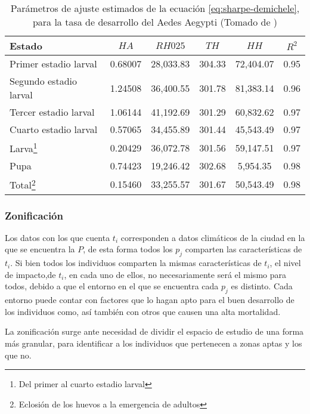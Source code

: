 \begin{table}
\begin{minipage}{\paperwidth}
\begin{tabular}{p{6cm} c c c c c }
Estado                     & $HA$    & $RH025$   & $TH$   & $HH$      & $R^2$   \\
\hline
Primer estadio larval      & 0.68007 & 28,033.83 & 304.33 & 72,404.07 & 0.95 \\
Segundo estadio larval     & 1.24508 & 36,400.55 & 301.78 & 81,383.14 & 0.96 \\
Tercer estadio larval      & 1.06144 & 41,192.69 & 301.29 & 60,832.62 & 0.97 \\
Cuarto estadio larval      & 0.57065 & 34,455.89 & 301.44 & 45,543.49 & 0.97 \\
Larva\footnote{Del primer al cuarto estadio larval} & 0.20429 & 36,072.78 & 301.56 & 59,147.51 & 0.97 \\
Pupa                       & 0.74423 & 19,246.42 & 302.68 & 5,954.35 & 0.98  \\
Total\footnote{Eclosión de los huevos a la emergencia de adultos}& 0.15460 & 33,255.57 & 301.67 & 50,543.49 & 0.98 \\

\end{tabular}
\end{minipage}
\caption{ \label{tab:tasa-desarrollo} Parámetros de ajuste estimados de la ecuación \eqref{eq:sharpe-demichele}, 
para la tasa de desarrollo del Aedes Aegypti (Tomado de \cite{rueda1990temperature})}
 
\end{table}

\subsubsection{Zonificación}
Los datos con los que cuenta $t_{i}$ corresponden a datos climáticos de la ciudad en la que se encuentra la
$P$, de esta forma todos los $p_{j}$ comparten las características de $t_{i}$. Si bien todos los individuos
comparten la mismas características de $t_{i}$, el nivel de impacto,de $t_{i}$, en cada uno de ellos, no
necesariamente será el mismo para todos, debido a que el entorno en el que se encuentra cada $p_{j}$ es 
distinto. Cada entorno puede contar con factores que lo hagan apto para el buen desarrollo de los individuos
como, así también con otros que causen una alta mortalidad.

La zonificación surge ante necesidad de dividir el espacio de estudio de una forma más granular, para identificar
a los individuos que pertenecen a zonas aptas y los que no. 


